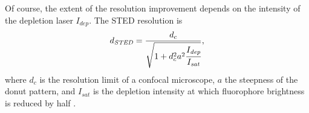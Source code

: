 
Of course, the extent of the resolution improvement depends on the intensity of the depletion laser $ I_\mathit{dep}$. The STED resolution is
\begin{equation}
	d_\mathit{STED} = \frac{d_c}{\sqrt{1+d_c^2a^2\cfrac{I_\mathit{dep}}{I_\mathit{sat}}}},
\end{equation}
where $ d_c $ is the resolution limit of a confocal microscope, $ a $ the steepness of the donut pattern, and $ I_\mathit{sat} $ is the depletion intensity at which fluorophore brightness is reduced by half \cite{Harke2008}.
